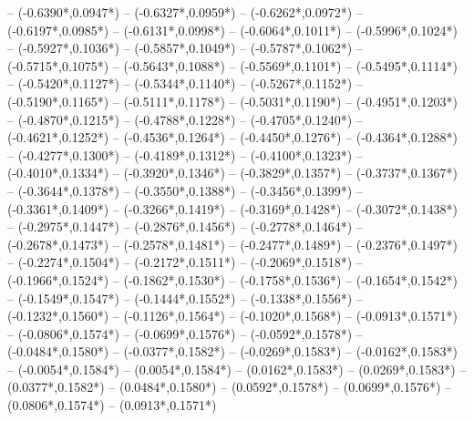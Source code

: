 {	-- ({-0.6390*\dx},{0.0947*\dy})
	-- ({-0.6327*\dx},{0.0959*\dy})
	-- ({-0.6262*\dx},{0.0972*\dy})
	-- ({-0.6197*\dx},{0.0985*\dy})
	-- ({-0.6131*\dx},{0.0998*\dy})
	-- ({-0.6064*\dx},{0.1011*\dy})
	-- ({-0.5996*\dx},{0.1024*\dy})
	-- ({-0.5927*\dx},{0.1036*\dy})
	-- ({-0.5857*\dx},{0.1049*\dy})
	-- ({-0.5787*\dx},{0.1062*\dy})
	-- ({-0.5715*\dx},{0.1075*\dy})
	-- ({-0.5643*\dx},{0.1088*\dy})
	-- ({-0.5569*\dx},{0.1101*\dy})
	-- ({-0.5495*\dx},{0.1114*\dy})
	-- ({-0.5420*\dx},{0.1127*\dy})
	-- ({-0.5344*\dx},{0.1140*\dy})
	-- ({-0.5267*\dx},{0.1152*\dy})
	-- ({-0.5190*\dx},{0.1165*\dy})
	-- ({-0.5111*\dx},{0.1178*\dy})
	-- ({-0.5031*\dx},{0.1190*\dy})
	-- ({-0.4951*\dx},{0.1203*\dy})
	-- ({-0.4870*\dx},{0.1215*\dy})
	-- ({-0.4788*\dx},{0.1228*\dy})
	-- ({-0.4705*\dx},{0.1240*\dy})
	-- ({-0.4621*\dx},{0.1252*\dy})
	-- ({-0.4536*\dx},{0.1264*\dy})
	-- ({-0.4450*\dx},{0.1276*\dy})
	-- ({-0.4364*\dx},{0.1288*\dy})
	-- ({-0.4277*\dx},{0.1300*\dy})
	-- ({-0.4189*\dx},{0.1312*\dy})
	-- ({-0.4100*\dx},{0.1323*\dy})
	-- ({-0.4010*\dx},{0.1334*\dy})
	-- ({-0.3920*\dx},{0.1346*\dy})
	-- ({-0.3829*\dx},{0.1357*\dy})
	-- ({-0.3737*\dx},{0.1367*\dy})
	-- ({-0.3644*\dx},{0.1378*\dy})
	-- ({-0.3550*\dx},{0.1388*\dy})
	-- ({-0.3456*\dx},{0.1399*\dy})
	-- ({-0.3361*\dx},{0.1409*\dy})
	-- ({-0.3266*\dx},{0.1419*\dy})
	-- ({-0.3169*\dx},{0.1428*\dy})
	-- ({-0.3072*\dx},{0.1438*\dy})
	-- ({-0.2975*\dx},{0.1447*\dy})
	-- ({-0.2876*\dx},{0.1456*\dy})
	-- ({-0.2778*\dx},{0.1464*\dy})
	-- ({-0.2678*\dx},{0.1473*\dy})
	-- ({-0.2578*\dx},{0.1481*\dy})
	-- ({-0.2477*\dx},{0.1489*\dy})
	-- ({-0.2376*\dx},{0.1497*\dy})
	-- ({-0.2274*\dx},{0.1504*\dy})
	-- ({-0.2172*\dx},{0.1511*\dy})
	-- ({-0.2069*\dx},{0.1518*\dy})
	-- ({-0.1966*\dx},{0.1524*\dy})
	-- ({-0.1862*\dx},{0.1530*\dy})
	-- ({-0.1758*\dx},{0.1536*\dy})
	-- ({-0.1654*\dx},{0.1542*\dy})
	-- ({-0.1549*\dx},{0.1547*\dy})
	-- ({-0.1444*\dx},{0.1552*\dy})
	-- ({-0.1338*\dx},{0.1556*\dy})
	-- ({-0.1232*\dx},{0.1560*\dy})
	-- ({-0.1126*\dx},{0.1564*\dy})
	-- ({-0.1020*\dx},{0.1568*\dy})
	-- ({-0.0913*\dx},{0.1571*\dy})
	-- ({-0.0806*\dx},{0.1574*\dy})
	-- ({-0.0699*\dx},{0.1576*\dy})
	-- ({-0.0592*\dx},{0.1578*\dy})
	-- ({-0.0484*\dx},{0.1580*\dy})
	-- ({-0.0377*\dx},{0.1582*\dy})
	-- ({-0.0269*\dx},{0.1583*\dy})
	-- ({-0.0162*\dx},{0.1583*\dy})
	-- ({-0.0054*\dx},{0.1584*\dy})
	-- ({0.0054*\dx},{0.1584*\dy})
	-- ({0.0162*\dx},{0.1583*\dy})
	-- ({0.0269*\dx},{0.1583*\dy})
	-- ({0.0377*\dx},{0.1582*\dy})
	-- ({0.0484*\dx},{0.1580*\dy})
	-- ({0.0592*\dx},{0.1578*\dy})
	-- ({0.0699*\dx},{0.1576*\dy})
	-- ({0.0806*\dx},{0.1574*\dy})
	-- ({0.0913*\dx},{0.1571*\dy})
}
